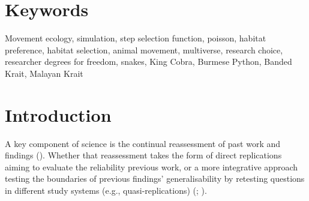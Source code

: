 \documentclass[10pt,a4paper]{article}
\begin{document}
\section*{Keywords}

Movement ecology, simulation, step selection function, poisson, habitat preference, habitat selection, animal movement, multiverse, research choice, researcher degrees for freedom, snakes, King Cobra, Burmese Python, Banded Krait, Malayan Krait

\clearpage
\pagestyle{fancy}

\section{Introduction}\label{introduction}

A key component of science is the continual reassessment of past work and findings ().
Whether that reassessment takes the form of direct replications aiming to evaluate the reliability previous work, or a more integrative approach testing the boundaries of previous findings' generalisability by retesting questions in different study systems (e.g., quasi-replications) (; ).
\end{document}
